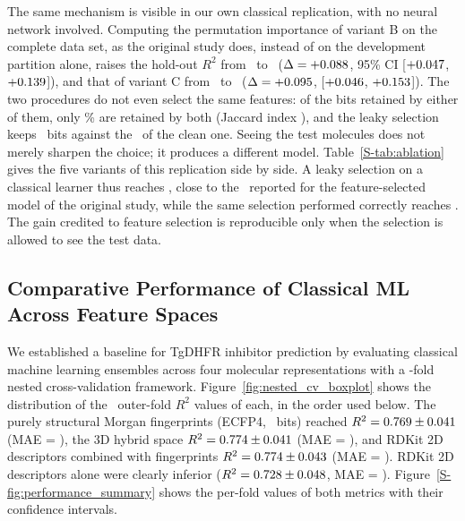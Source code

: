 The same mechanism is visible in our own classical replication, with no neural network involved. Computing the
permutation importance of variant B on the complete data set, as the original study does, instead of on the development
partition alone, raises the hold-out $R^2$ from \ExpBRTwoMean\ to \ExpBleakyRTwoMean\ ($\Delta =
+0.088$, 95\% CI [$+0.047$, $+0.139$]), and that of variant C from
\ExpCRTwoMean\ to \ExpCleakyRTwoMean\ ($\Delta = +0.095$, [$+0.046$,
$+0.153$]). The two procedures do not even select the same features: of the bits retained by either of them, only
\ExpLeakyMaskJaccardPct\% are retained by both (Jaccard index \ExpLeakyMaskJaccard), and the leaky selection keeps
\ExpBleakyNFeaturesSelected\ bits against the \ExpBNFeaturesSelected\ of the clean one. Seeing the test molecules
does not merely sharpen the choice; it produces a different model. Table~\ref{S-tab:ablation} gives the
five variants of this replication side by side. A leaky selection on a classical learner thus reaches
\ExpBleakyRTwoMean, close to the \PaperSelectedRTwo\ reported for the feature-selected model of the original study,
while the same selection performed correctly reaches \ExpBRTwoMean. The gain credited to feature selection is
reproducible only when the selection is allowed to see the test data.

\subsection{Comparative Performance of Classical ML Across Feature Spaces}
\label{sec:res_classical}

We established a baseline for TgDHFR inhibitor prediction by evaluating classical machine learning ensembles across four molecular representations with a \TotalOuterFolds-fold nested cross-validation framework. Figure~\ref{fig:nested_cv_boxplot} shows the distribution of the \TotalOuterFolds\ outer-fold $R^2$ values of each, in the order used below. The purely structural Morgan fingerprints (ECFP4, \MorganNFeaturesTotal\ bits) reached $R^2 = 0.769 \pm 0.041$ (MAE = \MorganMaeMean), the 3D hybrid space $R^2 = 0.774 \pm 0.041$ (MAE = \RdkitTwoDThreeDFpMaeMean), and RDKit 2D descriptors combined with fingerprints $R^2 = 0.774 \pm 0.043$ (MAE = \RdkitTwoDFpMaeMean). RDKit 2D descriptors alone were clearly inferior ($R^2 = 0.728 \pm 0.048$, MAE = \RdkitTwoDMaeMean). Figure~\ref{S-fig:performance_summary} shows the per-fold values of both metrics with their confidence intervals.

